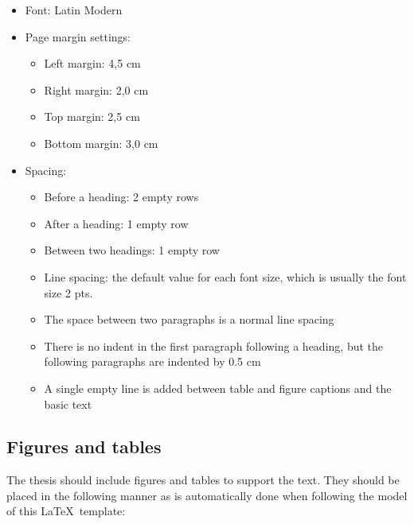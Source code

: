 \begin{itemize}
    \setlength\itemsep{0pt}
    \setlength\parskip{0pt}
    \item Font: Latin Modern
    \item Page margin settings:
    \begin{itemize}[wide=0pt]
        \setlength\itemsep{0pt}
        \setlength\parskip{0pt}
        \item Left margin: 4,5 cm
        \item Right margin: 2,0 cm
        \item Top margin: 2,5 cm
        \item Bottom margin: 3,0 cm
    \end{itemize}
    \item Spacing:
    \begin{itemize}[wide=0pt]
        \setlength\itemsep{0pt}
        \setlength\parskip{0pt}
        \item Before a heading: 2 empty rows
        \item After a heading: 1 empty row
        \item Between two headings: 1 empty row
        \item Line spacing: the default value for each font size, which is usually the font size 2 pts.
        \item The space between two paragraphs is a normal line spacing
        \item There is no indent in the first paragraph following a heading, but the following
paragraphs are indented by 0.5 cm
        \item A single empty line is added between table and figure captions and the basic text
    \end{itemize}    
\end{itemize}

\subsection{Figures and tables}
The thesis should include figures and tables to support the text. They should be placed in the following manner as is automatically done when following the model of this \LaTeX\ template:

